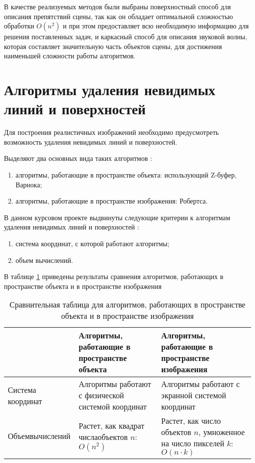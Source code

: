 В качестве реализуемых методов были выбраны поверхностный способ для описания препятствий сцены, так как он обладает оптимальной сложностью обработки $O(n^2)$ и при этом предоставляет всю необходимую информацию для решения поставленных задач, и каркасный способ для описания звуковой волны, которая составляет значительную часть объектов сцены, для достижения наименьшей сложности работы алгоритмов.

\clearpage

\section{Алгоритмы удаления невидимых линий и поверхностей}

Для построения реалистичных изображений необходимо предусмотреть возможность удаления невидимых линий и поверхностей.

Выделяют два основных вида таких алгоритмов \cite{invisible1}:
\begin{enumerate}
	\item алгоритмы, работающие в пространстве объекта: использующий Z-буфер, Варнока;
	\item алгоритмы, работающие в пространстве изображения: Робертса.
\end{enumerate}

В данном курсовом проекте выдвинуты следующие критерии к алгоритмам удаления невидимых линий и поверхностей \cite{compareInvisible1}:
\begin{enumerate}
	\item система координат, с которой работают алгоритмы;
	\item объем вычислений.
\end{enumerate}

В таблице \ref{table:compareInvisible} приведены результаты сравнения алгоритмов, работающих в пространстве объекта и в пространстве изображения \cite{compareInvisible1}
\begin{table}[h!]
	\begin{center}
		\caption{\label{table:compareInvisible} Сравнительная таблица для алгоритмов, работающих в пространстве объекта и в пространстве изображения}
		\begin{tabular}{|p{70pt}|p{190pt}|p{190pt}|}
			\hline
			~ & Алгоритмы, работающие в пространстве объекта & Алгоритмы, работающие в пространстве изображения \\ \hline
			Система координат & Алгоритмы работают с физической системой координат & Алгоритмы работают с экранной системой координат \\ \hline
			Объем\newline вычислений & Растет, как квадрат числа\newline объектов $n$: $O(n^2)$ & Растет, как число объектов $n$, умноженное на число пикселей $k$: $O(n \cdot k)$ \\ \hline
		\end{tabular}
	\end{center}
\end{table}

